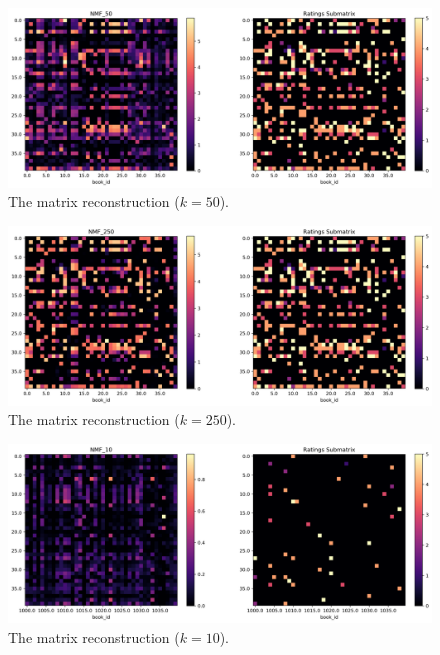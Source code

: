 \documentclass[handout]{beamer}
\begin{document}
\begin{frame}
 \begin{figure}[t]
    \includegraphics[width=\linewidth]{../image/goodreads-models/nmf-50-left-close.png}
    \caption[NMF-50-left-close]{The matrix reconstruction ($k=50$).}
     \label{fig:nmf-50-left-close}
\end{figure}
\end{frame}


\begin{frame}
 \begin{figure}[t]
    \includegraphics[width=\linewidth]{../image/goodreads-models/nmf-250-left-close.png}
    \caption[NMF-250-left-close]{The matrix reconstruction ($k=250$).}
     \label{fig:nmf-250-left-close}
\end{figure}
\end{frame}


\begin{frame}
 \begin{figure}[t]
    \includegraphics[width=\linewidth]{../image/goodreads-models/nmf-10-left-center-close.png}
    \caption[NMF-10-left-center-close]{The matrix reconstruction ($k=10$).}
     \label{fig:nmf-10-left-center-close}
\end{figure}
\end{frame}
\end{document}
